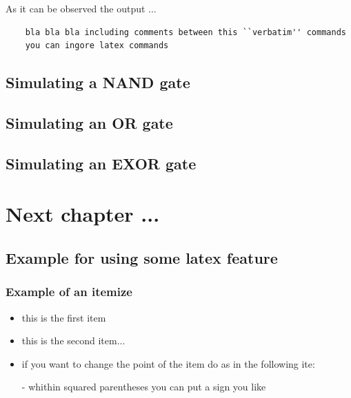 As it can be observed the output ...

	\begin{verbatim}
	bla bla bla including comments between this ``verbatim'' commands
	you can ingore latex commands  	
	\end{verbatim}



\section{Simulating a NAND gate}

\section{Simulating an OR gate}


\section{Simulating an EXOR gate}



\chapter{Next chapter ...}



\section{Example for using some latex feature}

\subsection{Example of an itemize}

\begin{itemize}
\item this is the first item
\item this is the second item...
\item if you want to change the point of the item do as in the following ite:
\item[-] whithin squared parentheses you can put a sign you like
\end{itemize} 


